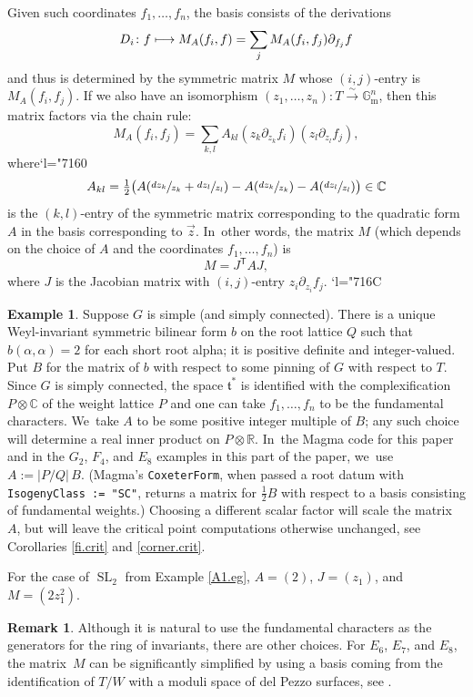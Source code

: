 \documentclass[JEP,XML,SOM,Unicode,NoFloatCountersInSection,published]{cedram}
\newcommand\mto{\mathchoice{\longmapsto}{\mapsto}{\mapsto}{\mapsto}}
\newcommand{\Changel}{\mathcode`l="7160}
\newcommand{\Changelback}{\mathcode`l="716C}
\theoremstyle{definition}
\newtheorem{example}[equation]{Example}
\newtheorem{rmk}[equation]{Remark}
\let\:\colon
\newcommand{\mft}{\mathfrak{t}}
\newcommand{\trans}{\mathsf{T}}
\newcommand{\R}{\mathbb{R}}
\newcommand{\C}{\mathbb{C}}
\newcommand{\Gm}{\mathbb{G}_{\mathrm{m}}}
\DeclareMathOperator{\SL}{SL}
\begin{document}
Given such coordinates $f_1,\dots,f_n$, the basis consists of the derivations
\begin{equation} \label{Di.def}
D_i\:f\mto M_A(f_i,f) = \sum_j M_A(f_i,f_j) \partial_{f_j} f
\end{equation}
and thus is determined by the symmetric matrix $M$ whose $(i,j)$-entry is
$M_A(f_i,f_j)$. If we also have an isomorphism $(z_1,\dots,z_n)\:T
\xrightarrow{\sim} \Gm^n$, then this matrix factors via the chain rule:
\[
M_A(f_i,f_j) = \sum_{k,l} A_{kl}
(z_k\partial_{z_k}f_i)(z_l\partial_{z_l}f_j),
\]
where\Changel
\[
A_{kl} =
\textstyle\frac{1}{2}\bigl(A(\sfrac{dz_k}{z_k}+\sfrac{dz_l}{z_l})-A(\sfrac{dz_k}{z_k})-A(\sfrac{dz_l}{z_l}) \bigr)
\in\C
\]
is the $(k,l)$-entry of the symmetric matrix corresponding to the quadratic form $A$ in the
basis corresponding to $\vec{z}$. In~other words, the matrix $M$ (which depends on the choice of $A$ and the coordinates $f_1, \ldots, f_n$) is
\[
M = J^\trans A J,
\]
where $J$ is the Jacobian matrix with $(i, j)$-entry $z_i\partial_{z_i}f_j$.
\Changelback

\begin{example} \label{simple.A}
Suppose $G$ is simple (and simply connected). There is a unique Weyl-invariant symmetric bilinear form $b$ on the root lattice $Q$ such that $b(\alpha, \alpha) = 2$ for each short root alpha; it is positive definite and integer-valued. Put $B$ for the matrix of $b$ with respect to some pinning of $G$ with respect to $T$. Since $G$ is simply connected, the space $\mft^*$ is identified with the complexification $P \otimes \C$ of the weight lattice $P$ and one can take $f_1, \ldots, f_n$ to be the fundamental characters. We~take $A$ to be some positive integer multiple of $B$; any such choice will determine a real inner product on $P \otimes \R$. In~the Magma code for this paper and in the $G_2$, $F_4$, and $E_8$ examples in this part of the paper, we~use $A := | P/Q | \, B$.
(Magma's \texttt{CoxeterForm}, when passed a root datum with \texttt{IsogenyClass := "SC"}, returns a matrix for $\frac12 B$ with respect to a basis consisting of fundamental weights.) Choosing a different scalar factor will scale the matrix $A$, but will leave the critical point computations otherwise unchanged, see Corollaries \ref{fi.crit} and \ref{corner.crit}.

For the case of $\SL_2$ from Example \ref{A1.eg}, $A = (2)$, $J = (z_1)$, and $M = (2z_1^2)$.
\end{example}

\begin{rmk}
Although it is natural to use the fundamental characters as the generators for the ring of invariants, there are other choices.
For $E_6$, $E_7$, and $E_8$, the matrix~$M$ can be significantly simplified by using a basis coming from the identification of $T/W$ with a moduli space of del Pezzo surfaces, see \cite{EOR}.
\end{rmk}
\end{document}
